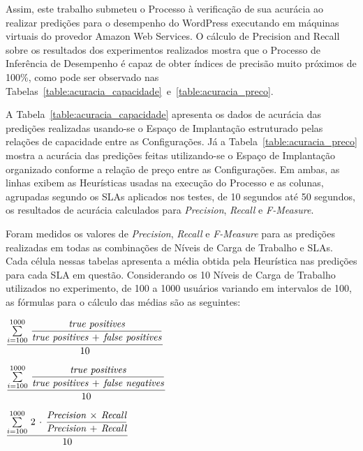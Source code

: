 Assim, este trabalho submeteu o Processo à verificação de sua acurácia ao realizar
predições para o desempenho do WordPress executando em máquinas virtuais do provedor
Amazon Web Services. O cálculo de Precision and Recall~\cite{powers2011evaluation} 
sobre os resultados dos experimentos realizados mostra que o Processo de Inferência 
de Desempenho é capaz de obter índices de precisão muito próximos de 100\%, como 
pode ser observado nas Tabelas~\ref{table:acuracia_capacidade}~e~\ref{table:acuracia_preco}. 

A Tabela~\ref{table:acuracia_capacidade} apresenta os dados de acurácia das 
predições realizadas usando-se o Espaço de Implantação estruturado pelas relações
de capacidade entre as Configurações. Já a Tabela~\ref{table:acuracia_preco} mostra
a acurácia das predições feitas utilizando-se o Espaço de Implantação organizado
conforme a relação de preço entre as Configurações. Em ambas, as linhas exibem 
as Heurísticas usadas na execução do Processo e as colunas, agrupadas segundo
os SLAs aplicados nos testes, de 10 segundos até 50 segundos, os resultados 
de acurácia calculados para \emph{Precision}, \emph{Recall} e \emph{F-Measure}.

Foram medidos os valores de \emph{Precision}, \emph{Recall} e \emph{F-Measure}
para as predições realizadas em todas as combinações de Níveis de Carga de 
Trabalho e SLAs. Cada célula nessas tabelas apresenta a média obtida pela 
Heurística nas predições para cada SLA em questão. Considerando os 10 Níveis
de Carga de Trabalho utilizados no experimento, de 100 a 1000 usuários variando
em intervalos de 100, as fórmulas para o cálculo das médias são as seguintes: 

\begin{description}[leftmargin=!,labelwidth=\widthof{\bfseries F-Measure:}]
  \item[\emph{Precision}:] $\dfrac{\sum\limits_{i=100}^{1000}\,\dfrac{\emph{true positives}}{\emph{true positives}\,+\,\emph{false positives}}}{10}$
  \item[\emph{Recall}:] $\dfrac{\sum\limits_{i=100}^{1000}\,\dfrac{\emph{true positives}}{\emph{true positives}\,+\,\emph{false negatives}}}{10}$
  \item[\emph{F-Measure}:] $\dfrac{\sum\limits_{i=100}^{1000}\,2\,\cdot\,\dfrac{\emph{Precision}\,\times\,\emph{Recall}}{\emph{Precision}\,+\,\emph{Recall}}}{10}$
\end{description}

